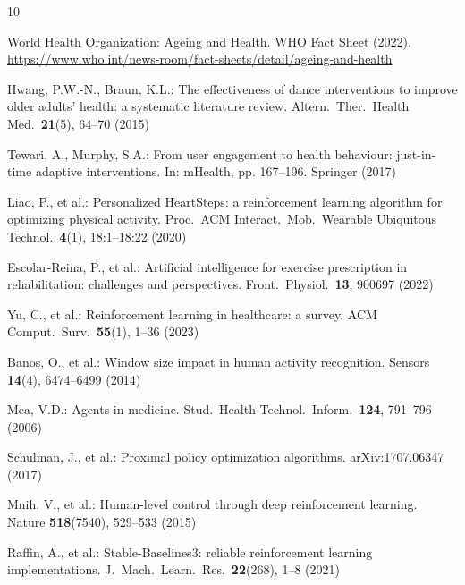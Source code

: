 \documentclass[runningheads]{llncs}
\begin{document}
%
%
\begin{thebibliography}{10}

World Health Organization: Ageing and Health. WHO Fact Sheet (2022).
\url{https://www.who.int/news-room/fact-sheets/detail/ageing-and-health}

Hwang, P.W.-N., Braun, K.L.: The effectiveness of dance interventions to
improve older adults' health: a systematic literature review. Altern.\ Ther.\
Health Med.\ \textbf{21}(5), 64--70 (2015)

Tewari, A., Murphy, S.A.: From user engagement to health behaviour: just-in-time
adaptive interventions. In: mHealth, pp. 167--196. Springer (2017)

Liao, P., et al.: Personalized HeartSteps: a reinforcement learning algorithm
for optimizing physical activity. Proc.\ ACM Interact.\ Mob.\ Wearable Ubiquitous
Technol.\ \textbf{4}(1), 18:1--18:22 (2020)

Escolar-Reina, P., et al.: Artificial intelligence for exercise prescription in
rehabilitation: challenges and perspectives. Front.\ Physiol.\ \textbf{13},
900697 (2022)

Yu, C., et al.: Reinforcement learning in healthcare: a survey. ACM Comput.\ Surv.\
\textbf{55}(1), 1--36 (2023)

Banos, O., et al.: Window size impact in human activity recognition. Sensors
\textbf{14}(4), 6474--6499 (2014)

Mea, V.D.: Agents in medicine. Stud.\ Health Technol.\ Inform.\ \textbf{124},
791--796 (2006)

Schulman, J., et al.: Proximal policy optimization algorithms.
arXiv:1707.06347 (2017)

Mnih, V., et al.: Human-level control through deep reinforcement learning.
Nature \textbf{518}(7540), 529--533 (2015)

Raffin, A., et al.: Stable-Baselines3: reliable reinforcement learning
implementations. J.\ Mach.\ Learn.\ Res.\ \textbf{22}(268), 1--8 (2021)

\end{thebibliography}
\end{document}
